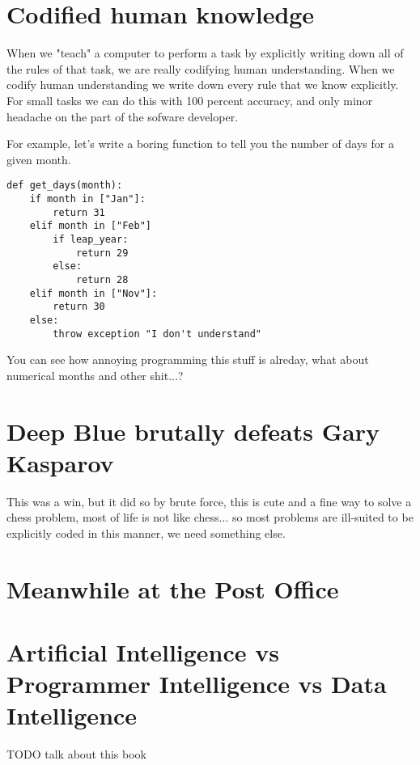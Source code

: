 \section{Codified human knowledge}

When we "teach" a computer to perform a task by explicitly writing down all of the rules of that task, we are really codifying human understanding. When we codify human understanding we write down every rule that we know explicitly. For small tasks we can do this with 100 percent accuracy, and only minor headache on the part of the sofware developer. 

For example, let's write a boring function to tell you the number of days for a given month. 

\begin{lstlisting}[style=kaolstplain,linewidth=1.5\textwidth]
def get_days(month):
	if month in ["Jan"]:
		return 31
	elif month in ["Feb"]
		if leap_year:
			return 29
		else:
			return 28
	elif month in ["Nov"]:
		return 30
	else:
		throw exception "I don't understand"
\end{lstlisting}

You can see how annoying programming this stuff is alreday, what about numerical months and other shit...?

\section{Deep Blue brutally defeats Gary Kasparov}

This was a win, but it did so by brute force, this is cute and a fine way to solve a chess problem, most of life is not like chess... so most problems are ill-suited to be explicitly coded in this manner, we need something else.

\section{Meanwhile at the Post Office}



\section{Artificial Intelligence vs Programmer Intelligence vs Data Intelligence}



TODO talk about this book 



